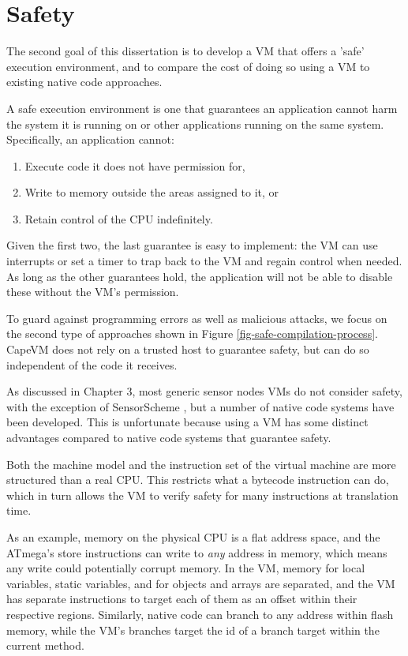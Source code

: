 \chapter{Safety}
\label{sec-safety}


The second goal of this dissertation is to develop a VM that offers a 'safe' execution environment, and to compare the cost of doing so using a VM to existing native code approaches.

A safe execution environment is one that guarantees an application cannot harm the system it is running on or other applications running on the same system. Specifically, an application cannot:
\begin{enumerate}
    \item Execute code it does not have permission for,
    \item Write to memory outside the areas assigned to it, or
    \item Retain control of the CPU indefinitely.
\end{enumerate}

Given the first two, the last guarantee is easy to implement: the VM can use interrupts or set a timer to trap back to the VM and regain control when needed. As long as the other guarantees hold, the application will not be able to disable these without the VM's permission.

To guard against programming errors as well as malicious attacks, we focus on the second type of approaches shown in Figure \ref{fig-safe-compilation-process}. CapeVM does not rely on a trusted host to guarantee safety, but can do so independent of the code it receives.

As discussed in Chapter 3, most generic sensor nodes VMs do not consider safety, with the exception of SensorScheme \cite{Evers:2010ur}, but a number of native code systems have been developed. This is unfortunate because using a VM has some distinct advantages compared to native code systems that guarantee safety.

Both the machine model and the instruction set of the virtual machine are more structured than a real CPU. This restricts what a bytecode instruction can do, which in turn allows the VM to verify safety for many instructions at translation time.

As an example, memory on the physical CPU is a flat address space, and the ATmega's store instructions can write to \emph{any} address in memory, which means any write could potentially corrupt memory. In the VM, memory for local variables, static variables, and for objects and arrays are separated, and the VM has separate instructions to target each of them as an offset within their respective regions. Similarly, native code can branch to any address within flash memory, while the VM's branches target the id of a branch target within the current method.

